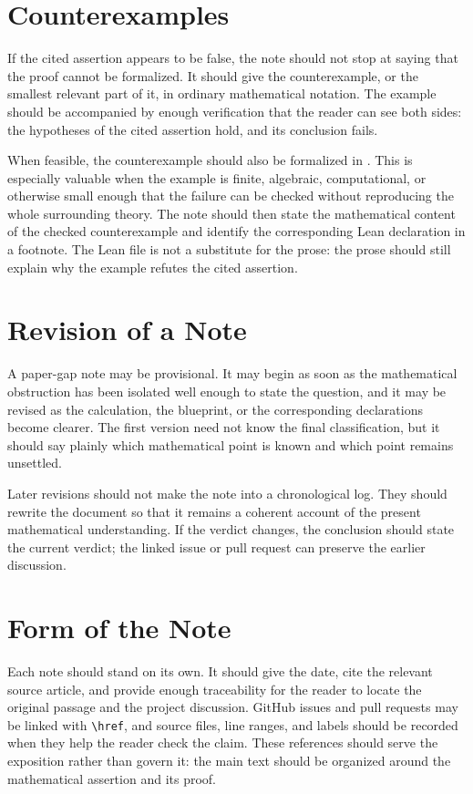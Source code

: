 \documentclass[11pt]{article}
\begin{document}
\section{Counterexamples}

If the cited assertion appears to be false, the note should not stop at saying
that the proof cannot be formalized.  It should give the counterexample, or the
smallest relevant part of it, in ordinary mathematical notation.  The example
should be accompanied by enough verification that the reader can see both sides:
the hypotheses of the cited assertion hold, and its conclusion fails.

When feasible, the counterexample should also be formalized in \Lean{}.  This is
especially valuable when the example is finite, algebraic, computational, or
otherwise small enough that the failure can be checked without reproducing the
whole surrounding theory.  The note should then state the mathematical content
of the checked counterexample and identify the corresponding Lean declaration in
a footnote.  The Lean file is not a substitute for the prose: the prose should
still explain why the example refutes the cited assertion.

\section{Revision of a Note}

A paper-gap note may be provisional.  It may begin as soon as the mathematical
obstruction has been isolated well enough to state the question, and it may be
revised as the calculation, the blueprint, or the corresponding \Lean{}
declarations become clearer.  The first version need not know the final
classification, but it should say plainly which mathematical point is known and
which point remains unsettled.

Later revisions should not make the note into a chronological log.  They should
rewrite the document so that it remains a coherent account of the present
mathematical understanding.  If the verdict changes, the conclusion should state
the current verdict; the linked issue or pull request can preserve the earlier
discussion.

\section{Form of the Note}

Each note should stand on its own.  It should give the date, cite the relevant
source article, and provide enough traceability for the reader to locate the
original passage and the project discussion.  GitHub issues and pull requests may
be linked with \verb|\href|, and source files, line ranges, and labels should be
recorded when they help the reader check the claim.  These references should
serve the exposition rather than govern it: the main text should be organized
around the mathematical assertion and its proof.
\end{document}
